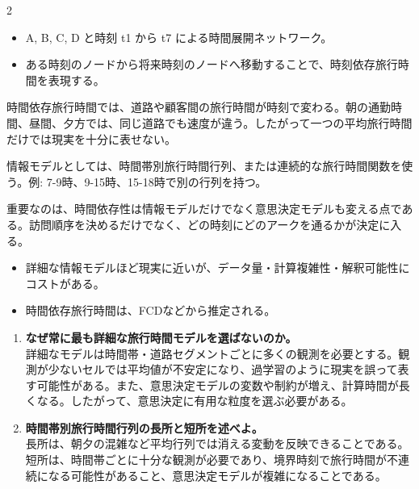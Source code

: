 \clearpage
{}
\begin{multicols}{2}\footnotesize\raggedcolumns
{}
\begin{itemize}
\item A, B, C, D と時刻 t1 から t7 による時間展開ネットワーク。
\item ある時刻のノードから将来時刻のノードへ移動することで、時刻依存旅行時間を表現する。
\end{itemize}
時間依存旅行時間では、道路や顧客間の旅行時間が時刻で変わる。朝の通勤時間、昼間、夕方では、同じ道路でも速度が違う。したがって一つの平均旅行時間だけでは現実を十分に表せない。\par

情報モデルとしては、時間帯別旅行時間行列、または連続的な旅行時間関数を使う。例: 7-9時、9-15時、15-18時で別の行列を持つ。\par

重要なのは、時間依存性は情報モデルだけでなく意思決定モデルも変える点である。訪問順序を決めるだけでなく、どの時刻にどのアークを通るかが決定に入る。\par
{}
\begin{itemize}
\item 詳細な情報モデルほど現実に近いが、データ量・計算複雑性・解釈可能性にコストがある。
\item 時間依存旅行時間は、FCDなどから推定される。
\end{itemize}
\begin{enumerate}
\item \textbf{なぜ常に最も詳細な旅行時間モデルを選ばないのか。}\\詳細なモデルは時間帯・道路セグメントごとに多くの観測を必要とする。観測が少ないセルでは平均値が不安定になり、過学習のように現実を誤って表す可能性がある。また、意思決定モデルの変数や制約が増え、計算時間が長くなる。したがって、意思決定に有用な粒度を選ぶ必要がある。
\item \textbf{時間帯別旅行時間行列の長所と短所を述べよ。}\\長所は、朝夕の混雑など平均行列では消える変動を反映できることである。短所は、時間帯ごとに十分な観測が必要であり、境界時刻で旅行時間が不連続になる可能性があること、意思決定モデルが複雑になることである。
\end{enumerate}
\end{multicols}

